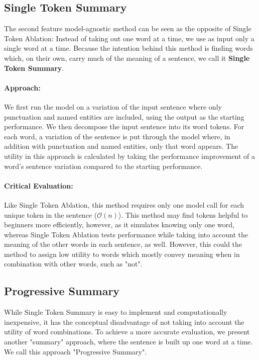 \subsection{Single Token Summary}
The second feature model-agnostic method can be seen as the opposite of Single Token Ablation:
Instead of taking out one word at a time, we use as input only a single word at a time.
Because the intention behind this method is finding words which, on their own, carry much of the meaning of a sentence, we call it \textbf{Single Token Summary}.

\paragraph{Approach:}
We first run the model on a variation of the input sentence where only punctuation and named entities are included, using the output as the starting performance.
We then decompose the input sentence into its word tokens.
For each word, a variation of the sentence is put through the model where, in addition with punctuation and named entities, only that word appears.
The utility in this approach is calculated by taking the performance improvement of a word's sentence variation compared to the starting performance.

\paragraph{Critical Evaluation:}
Like Single Token Ablation, this method requires only one model call for each unique token in the sentence ($\mathcal{O}(n)$).
This method may find tokens helpful to beginners more efficiently, however, as it simulates knowing only one word, whereas Single Token Ablation tests performance while taking into account the meaning of the other words in each sentence, as well.
However, this could the method to assign low utility to words which mostly convey meaning when in combination with other words, such as "not".


\subsection{Progressive Summary}
While Single Token Summary is easy to implement and computationally inexpensive, it has the conceptual disadvantage of not taking into account the utility of word combinations.
To achieve a more accurate evaluation, we present another "summary" approach, where the sentence is built up one word at a time.
We call this approach "Progressive Summary".

